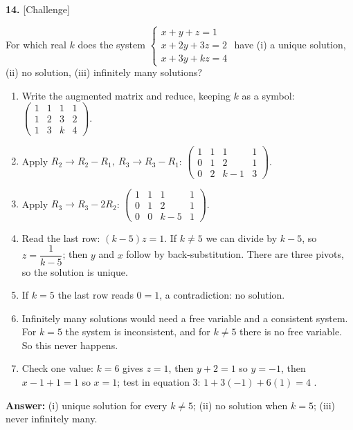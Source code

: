 \documentclass[11pt]{article}
\begin{document}
\par\vspace{2pt}
\begin{minipage}{\linewidth}\textbf{14.} \hfill{\scriptsize\color{ink}[Challenge]}\par\nopagebreak For which real $k$ does the system $\begin{cases}x+y+z=1\\ x+2y+3z=2\\ x+3y+kz=4\end{cases}$ have (i) a unique solution, (ii) no solution, (iii) infinitely many solutions?
\end{minipage}\par\nopagebreak
\begin{tcolorbox}[breakable,colback=ans,colframe=ansb,boxrule=0.5pt,left=4pt,right=4pt,top=2pt,bottom=2pt]\begin{enumerate}[leftmargin=2.2em,itemsep=1pt,topsep=1pt,label=\textbf{Step \arabic*.}]\item Write the augmented matrix and reduce, keeping $k$ as a symbol: $\displaystyle\left(\begin{array}{ccc|c}1&1&1&1\\1&2&3&2\\1&3&k&4\end{array}\right)$.
\item Apply $R_2\to R_2-R_1,\ R_3\to R_3-R_1$: $\displaystyle\left(\begin{array}{ccc|c}1&1&1&1\\0&1&2&1\\0&2&k-1&3\end{array}\right)$.
\item Apply $R_3\to R_3-2R_2$: $\displaystyle\left(\begin{array}{ccc|c}1&1&1&1\\0&1&2&1\\0&0&k-5&1\end{array}\right)$.
\item Read the last row: $(k-5)z=1$. If $k\neq5$ we can divide by $k-5$, so $z=\dfrac{1}{k-5}$; then $y$ and $x$ follow by back-substitution. There are three pivots, so the solution is unique.
\item If $k=5$ the last row reads $0=1$, a contradiction: no solution.
\item Infinitely many solutions would need a free variable and a consistent system. For $k=5$ the system is inconsistent, and for $k\neq5$ there is no free variable. So this never happens.
\item Check one value: $k=6$ gives $z=1$, then $y+2=1$ so $y=-1$, then $x-1+1=1$ so $x=1$; test in equation 3: $1+3(-1)+6(1)=4$ \checkmark.
\end{enumerate}\textbf{Answer:} (i) unique solution for every $k\neq5$; (ii) no solution when $k=5$; (iii) never infinitely many.\end{tcolorbox}
\end{document}
